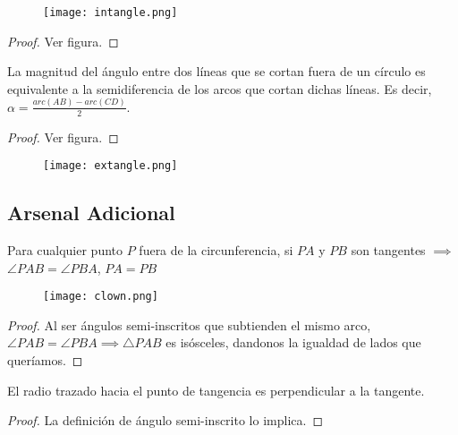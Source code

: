 \begin{figure}[h]
    \centering
    \texttt{[image: intangle.png]}
\end{figure}

\begin{proof}
    Ver figura.
\end{proof}

\begin{theorem}
    La magnitud del ángulo entre dos líneas que se cortan fuera
    de un círculo es equivalente a la semidiferencia de los arcos que 
    cortan dichas líneas. Es decir, 
    $\alpha = \frac{arc(AB)-arc(CD)}{2}.$
\end{theorem}
\begin{proof}
    Ver figura.
\end{proof}

\begin{figure}[h]
    \centering
    \texttt{[image: extangle.png]}
\end{figure}

\subsection{Arsenal Adicional}

\begin{lemma}
    Para cualquier punto $P$ fuera de la circunferencia, si 
    $PA$ y $PB$ son tangentes $\implies$ $\angle PAB = \angle PBA$, 
    $PA = PB$
\end{lemma}

\begin{figure}[h]
    \centering
    \texttt{[image: clown.png]}
\end{figure}

\begin{proof}
    Al ser ángulos semi-inscritos que subtienden el mismo arco, 
    $\angle PAB = \angle PBA \implies \triangle PAB$ es isósceles, 
    dandonos la igualdad de lados que queríamos.
\end{proof}

\begin{lemma}
    El radio trazado hacia el punto de tangencia es perpendicular 
    a la tangente.
\end{lemma}

\begin{proof}
    La definición de ángulo semi-inscrito lo implica.
\end{proof}

